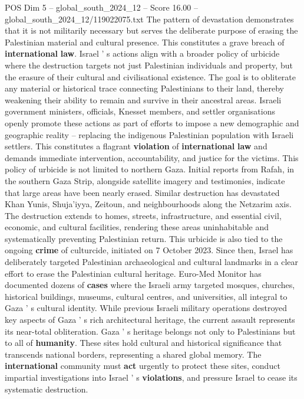 \begin{textsample}{POS Dim 5 – global\_south\_2024\_12 – Score 16.00 – global\_south\_2024\_12/119022075.txt}
The pattern of devastation demonstrates that it is not militarily necessary but serves the deliberate purpose of erasing the Palestinian material and cultural presence.
This constitutes a grave breach of \textbf{international} \textbf{law}.
Israel ' s actions align with a broader policy of urbicide where the destruction targets not just Palestinian individuals and property, but the erasure of their cultural and civilisational existence.
The goal is to obliterate any material or historical trace connecting Palestinians to their land, thereby weakening their ability to remain and survive in their ancestral areas.
Israeli government ministers, officials, Knesset members, and settler organisations openly promote these actions as part of efforts to impose a new demographic and geographic reality -- replacing the indigenous Palestinian population with Israeli settlers.
This constitutes a flagrant \textbf{violation} of \textbf{international} \textbf{law} and demands immediate intervention, accountability, and justice for the victims.
This policy of urbicide is not limited to northern Gaza.
Initial reports from Rafah, in the southern Gaza Strip, alongside satellite imagery and testimonies, indicate that large areas have been nearly erased.
Similar destruction has devastated Khan Yunis, Shuja'iyya, Zeitoun, and neighbourhoods along the Netzarim axis.
The destruction extends to homes, streets, infrastructure, and essential civil, economic, and cultural facilities, rendering these areas uninhabitable and systematically preventing Palestinian return.
This urbicide is also tied to the ongoing \textbf{crime} of culturcide, initiated on 7 October 2023.
Since then, Israel has deliberately targeted Palestinian archaeological and cultural landmarks in a clear effort to erase the Palestinian cultural heritage.
Euro-Med Monitor has documented dozens of \textbf{cases} where the Israeli army targeted mosques, churches, historical buildings, museums, cultural centres, and universities, all integral to Gaza ' s cultural identity.
While previous Israeli military operations destroyed key aspects of Gaza ' s rich architectural heritage, the current assault represents its near-total obliteration.
Gaza ' s heritage belongs not only to Palestinians but to all of \textbf{humanity}.
These sites hold cultural and historical significance that transcends national borders, representing a shared global memory.
The \textbf{international} community must \textbf{act} urgently to protect these sites, conduct impartial investigations into Israel ' s \textbf{violations}, and pressure Israel to cease its systematic destruction.

\end{textsample}
